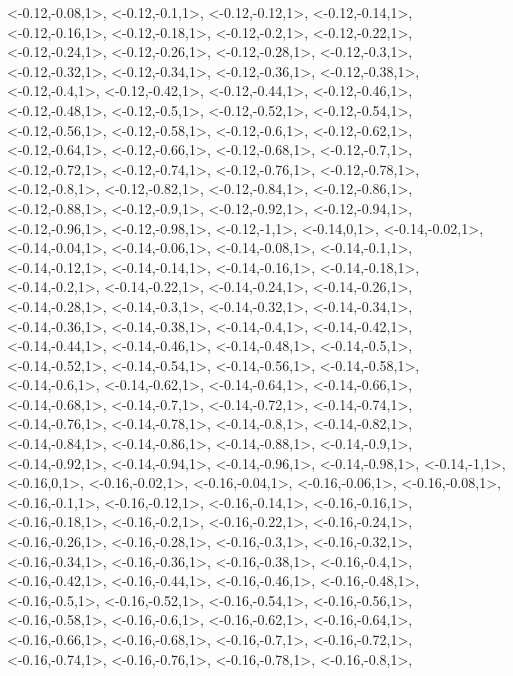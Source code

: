 \documentclass[a4paper,10pt]{article}
\begin{document}
\begin{eulernotebook}
\begin{euleroutput}
  <-0.12,-0.08,1>,
  <-0.12,-0.1,1>,
  <-0.12,-0.12,1>,
  <-0.12,-0.14,1>,
  <-0.12,-0.16,1>,
  <-0.12,-0.18,1>,
  <-0.12,-0.2,1>,
  <-0.12,-0.22,1>,
  <-0.12,-0.24,1>,
  <-0.12,-0.26,1>,
  <-0.12,-0.28,1>,
  <-0.12,-0.3,1>,
  <-0.12,-0.32,1>,
  <-0.12,-0.34,1>,
  <-0.12,-0.36,1>,
  <-0.12,-0.38,1>,
  <-0.12,-0.4,1>,
  <-0.12,-0.42,1>,
  <-0.12,-0.44,1>,
  <-0.12,-0.46,1>,
  <-0.12,-0.48,1>,
  <-0.12,-0.5,1>,
  <-0.12,-0.52,1>,
  <-0.12,-0.54,1>,
  <-0.12,-0.56,1>,
  <-0.12,-0.58,1>,
  <-0.12,-0.6,1>,
  <-0.12,-0.62,1>,
  <-0.12,-0.64,1>,
  <-0.12,-0.66,1>,
  <-0.12,-0.68,1>,
  <-0.12,-0.7,1>,
  <-0.12,-0.72,1>,
  <-0.12,-0.74,1>,
  <-0.12,-0.76,1>,
  <-0.12,-0.78,1>,
  <-0.12,-0.8,1>,
  <-0.12,-0.82,1>,
  <-0.12,-0.84,1>,
  <-0.12,-0.86,1>,
  <-0.12,-0.88,1>,
  <-0.12,-0.9,1>,
  <-0.12,-0.92,1>,
  <-0.12,-0.94,1>,
  <-0.12,-0.96,1>,
  <-0.12,-0.98,1>,
  <-0.12,-1,1>,
  <-0.14,0,1>,
  <-0.14,-0.02,1>,
  <-0.14,-0.04,1>,
  <-0.14,-0.06,1>,
  <-0.14,-0.08,1>,
  <-0.14,-0.1,1>,
  <-0.14,-0.12,1>,
  <-0.14,-0.14,1>,
  <-0.14,-0.16,1>,
  <-0.14,-0.18,1>,
  <-0.14,-0.2,1>,
  <-0.14,-0.22,1>,
  <-0.14,-0.24,1>,
  <-0.14,-0.26,1>,
  <-0.14,-0.28,1>,
  <-0.14,-0.3,1>,
  <-0.14,-0.32,1>,
  <-0.14,-0.34,1>,
  <-0.14,-0.36,1>,
  <-0.14,-0.38,1>,
  <-0.14,-0.4,1>,
  <-0.14,-0.42,1>,
  <-0.14,-0.44,1>,
  <-0.14,-0.46,1>,
  <-0.14,-0.48,1>,
  <-0.14,-0.5,1>,
  <-0.14,-0.52,1>,
  <-0.14,-0.54,1>,
  <-0.14,-0.56,1>,
  <-0.14,-0.58,1>,
  <-0.14,-0.6,1>,
  <-0.14,-0.62,1>,
  <-0.14,-0.64,1>,
  <-0.14,-0.66,1>,
  <-0.14,-0.68,1>,
  <-0.14,-0.7,1>,
  <-0.14,-0.72,1>,
  <-0.14,-0.74,1>,
  <-0.14,-0.76,1>,
  <-0.14,-0.78,1>,
  <-0.14,-0.8,1>,
  <-0.14,-0.82,1>,
  <-0.14,-0.84,1>,
  <-0.14,-0.86,1>,
  <-0.14,-0.88,1>,
  <-0.14,-0.9,1>,
  <-0.14,-0.92,1>,
  <-0.14,-0.94,1>,
  <-0.14,-0.96,1>,
  <-0.14,-0.98,1>,
  <-0.14,-1,1>,
  <-0.16,0,1>,
  <-0.16,-0.02,1>,
  <-0.16,-0.04,1>,
  <-0.16,-0.06,1>,
  <-0.16,-0.08,1>,
  <-0.16,-0.1,1>,
  <-0.16,-0.12,1>,
  <-0.16,-0.14,1>,
  <-0.16,-0.16,1>,
  <-0.16,-0.18,1>,
  <-0.16,-0.2,1>,
  <-0.16,-0.22,1>,
  <-0.16,-0.24,1>,
  <-0.16,-0.26,1>,
  <-0.16,-0.28,1>,
  <-0.16,-0.3,1>,
  <-0.16,-0.32,1>,
  <-0.16,-0.34,1>,
  <-0.16,-0.36,1>,
  <-0.16,-0.38,1>,
  <-0.16,-0.4,1>,
  <-0.16,-0.42,1>,
  <-0.16,-0.44,1>,
  <-0.16,-0.46,1>,
  <-0.16,-0.48,1>,
  <-0.16,-0.5,1>,
  <-0.16,-0.52,1>,
  <-0.16,-0.54,1>,
  <-0.16,-0.56,1>,
  <-0.16,-0.58,1>,
  <-0.16,-0.6,1>,
  <-0.16,-0.62,1>,
  <-0.16,-0.64,1>,
  <-0.16,-0.66,1>,
  <-0.16,-0.68,1>,
  <-0.16,-0.7,1>,
  <-0.16,-0.72,1>,
  <-0.16,-0.74,1>,
  <-0.16,-0.76,1>,
  <-0.16,-0.78,1>,
  <-0.16,-0.8,1>,

\end{euleroutput}
\end{eulernotebook}
\end{document}
